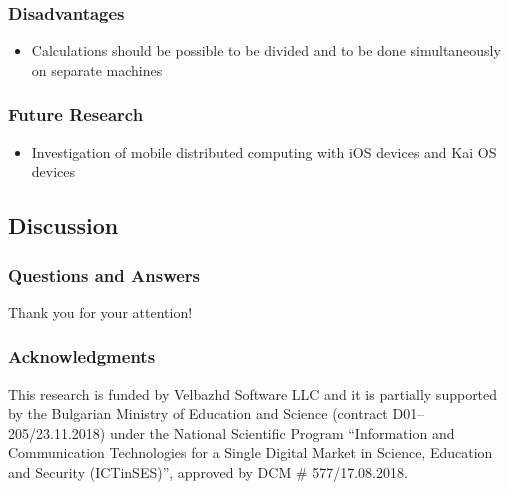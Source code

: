 \documentclass{beamer}
\begin{document}
\begin{frame}
\frametitle{Disadvantages}
\begin{itemize}
	\item Calculations should be possible to be divided and to be done simultaneously on separate machines
\end{itemize}
\end{frame}

\begin{frame}
\frametitle{Future Research}
\begin{itemize}
	\item Investigation of mobile distributed computing with iOS devices and Kai OS devices
\end{itemize}
\end{frame}

\subsection{Discussion}

\begin{frame}
\frametitle{Questions and Answers}
\center \huge{Thank you for your attention!}
\end{frame}

\begin{frame}
\frametitle{Acknowledgments}
This research is funded by Velbazhd Software LLC and it is partially supported by the Bulgarian Ministry of Education and Science (contract D01–205/23.11.2018) under the National Scientific Program ``Information and Communication Technologies for a Single Digital Market in Science, Education and Security (ICTinSES)'', approved by DCM \# 577/17.08.2018.
\end{frame}
\end{document}
